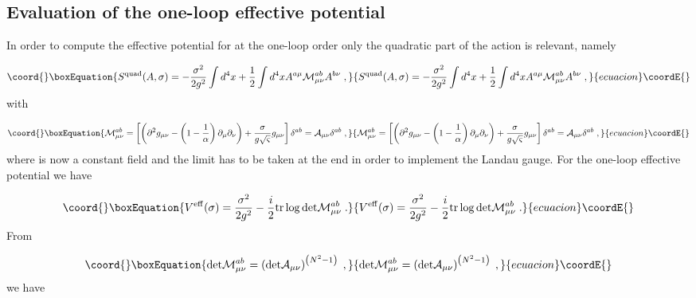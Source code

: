 \documentclass[a4paper,12pt]{article}
\begin{document}
\subsection{Evaluation of the one-loop effective potential}

In order to compute the effective potential for \myHighlight{$\sigma $}\coordHE{} at the one-loop
order only the quadratic part of the action \coordHE{} is relevant,
namely

\begin{equation}\coord{}\boxEquation{
S^{\mathrm{quad}}(A,\sigma )=-\frac{\sigma ^{2}}{2g^{2}}\int d^{4}x+\frac{1}{
2}\int d^{4}xA^{a\mu }\mathcal{M}_{\mu \nu }^{ab}A^{b\nu }\;,  \label{sq}
}{
S^{\mathrm{quad}}(A,\sigma )=-\frac{\sigma ^{2}}{2g^{2}}\int d^{4}x+\frac{1}{
2}\int d^{4}xA^{a\mu }\mathcal{M}_{\mu \nu }^{ab}A^{b\nu }\;,  }{ecuacion}\coordE{}\end{equation}
with

\begin{equation}\coord{}\boxEquation{
\mathcal{M}_{\mu \nu }^{ab}=\left[ \left( \partial ^{2}g_{\mu \nu }-\left( 1-
\frac{1}{\alpha }\right) \partial _{\mu }\partial _{\nu }\right) +\frac{
\sigma }{g\sqrt{\varsigma }}g_{\mu \nu }\right] \delta ^{ab}=\mathcal{A}
_{\mu \nu }\delta ^{ab}\;,  \label{m}
}{
\mathcal{M}_{\mu \nu }^{ab}=\left[ \left( \partial ^{2}g_{\mu \nu }-\left( 1-
\frac{1}{\alpha }\right) \partial _{\mu }\partial _{\nu }\right) +\frac{
\sigma }{g\sqrt{\varsigma }}g_{\mu \nu }\right] \delta ^{ab}=\mathcal{A}
_{\mu \nu }\delta ^{ab}\;,  }{ecuacion}\coordE{}\end{equation}
where \myHighlight{$\sigma $}\coordHE{} is now a constant field and the limit \coordHE{}
has to be taken at the end in order to implement the Landau gauge. For the
one-loop effective potential we have

\begin{equation}\coord{}\boxEquation{
V^{\mathrm{eff}}(\sigma )=\frac{\sigma ^{2}}{2g^{2}}-\frac{i}{2}\mathrm{
tr\log \det }\mathcal{M}_{\mu \nu }^{ab}\;.  \label{p}
}{
V^{\mathrm{eff}}(\sigma )=\frac{\sigma ^{2}}{2g^{2}}-\frac{i}{2}\mathrm{
tr\log \det }\mathcal{M}_{\mu \nu }^{ab}\;.  }{ecuacion}\coordE{}\end{equation}
From

\begin{equation}\coord{}\boxEquation{
\mathrm{\det }\mathcal{M}_{\mu \nu }^{ab}=\left( \mathrm{\det }\mathcal{A}
_{\mu \nu }\right) ^{\left( N^{2}-1\right) }\;,  \label{ma}
}{
\mathrm{\det }\mathcal{M}_{\mu \nu }^{ab}=\left( \mathrm{\det }\mathcal{A}
_{\mu \nu }\right) ^{\left( N^{2}-1\right) }\;,  }{ecuacion}\coordE{}\end{equation}
we have
\end{document}
